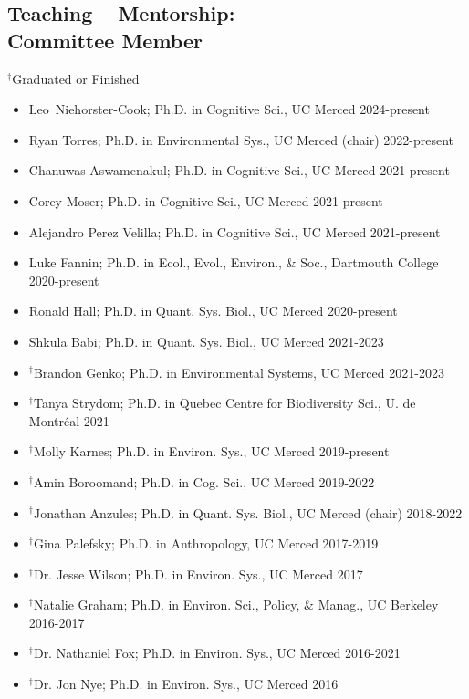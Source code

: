 \documentclass[margin,line,12pt]{res}
\begin{document}
\begin{resume}
\section{\sc Teaching -- Mentorship: \\ Committee Member}
{\footnotesize{${}^\dag$Graduated or Finished}}
\begin{itemize}
  \item Leo Niehorster-Cook; Ph.D. in Cognitive Sci., UC Merced \hfill 2024-present
  \item Ryan Torres; Ph.D. in Environmental Sys., UC Merced (chair) \hfill 2022-present
  \item Chanuwas Aswamenakul; Ph.D. in Cognitive Sci., UC Merced \hfill 2021-present 
  \item Corey Moser; Ph.D. in Cognitive Sci., UC Merced \hfill 2021-present
  \item Alejandro Perez Velilla; Ph.D. in Cognitive Sci., UC Merced \hfill 2021-present
  \item Luke Fannin; Ph.D. in Ecol., Evol., Environ., \& Soc., Dartmouth College \hfill 2020-present
  \item Ronald Hall; Ph.D. in Quant. Sys. Biol., UC Merced \hfill 2020-present
  \item Shkula Babi; Ph.D. in Quant. Sys. Biol., UC Merced \hfill 2021-2023
  \item ${}^\dag$Brandon Genko; Ph.D. in Environmental Systems, UC Merced \hfill 2021-2023
  \item ${}^\dag$Tanya Strydom; Ph.D. in Quebec Centre for Biodiversity Sci., U. de Montr\'eal \hfill 2021
  \item ${}^\dag$Molly Karnes; Ph.D. in Environ. Sys., UC Merced \hfill 2019-present
  \item ${}^\dag$Amin Boroomand; Ph.D. in Cog. Sci., UC Merced \hfill 2019-2022
  \item ${}^\dag$Jonathan Anzules; Ph.D. in Quant. Sys. Biol., UC Merced (chair) \hfill 2018-2022
  \item ${}^\dag$Gina Palefsky; Ph.D. in Anthropology, UC Merced \hfill 2017-2019
  \item ${}^\dag$Dr. Jesse Wilson; Ph.D. in Environ. Sys., UC Merced \hfill 2017
  \item ${}^\dag$Natalie Graham; Ph.D. in Environ. Sci., Policy, \& Manag., UC Berkeley \hfill 2016-2017
  \item ${}^\dag$Dr. Nathaniel Fox; Ph.D. in Environ. Sys., UC Merced \hfill 2016-2021
  \item ${}^\dag$Dr. Jon Nye; Ph.D. in Environ. Sys., UC Merced \hfill 2016
\end{itemize}




\end{resume}
\end{document}
